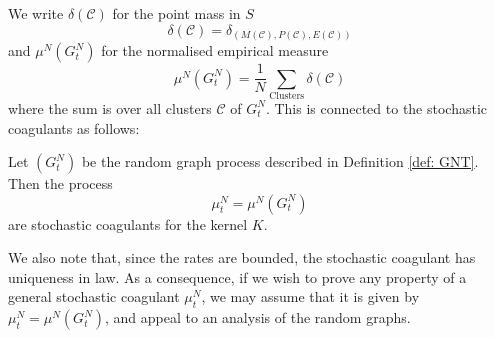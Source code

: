 \begin{equation}
\end{equation} We write $\delta(\mathcal{C})$ for the point mass in $S$ \begin{equation}
    \delta(\mathcal{C})=\delta_{(M(\mathcal{C}),P(\mathcal{C}),E(\mathcal{C}))}
\end{equation} and $\mu^N(G^N_t)$ for the normalised empirical measure \begin{equation} \mu^N(G^N_t)=\frac{1}{N}\sum_\text{Clusters} \delta(\mathcal{C})\end{equation} where the sum is over all clusters $\mathcal{C}$ of $G^N_t$. This is connected to the stochastic coagulants as follows: \begin{lemma}\label{lemma: coupling} Let $(G^N_t)$ be the random graph process described in Definition \ref{def: GNT}. Then the process \begin{equation}
    \mu^N_t=\mu^N(G^N_t)
\end{equation} are stochastic coagulants for the kernel $K$. \end{lemma} We also note that, since the rates are bounded, the stochastic coagulant has uniqueness in law. As a consequence, if we wish to prove any property of a general stochastic coagulant $\mu^N_t$, we may assume that it is given by $\mu^N_t=\mu^N(G^N_t)$, and appeal to an analysis of the random graphs.
